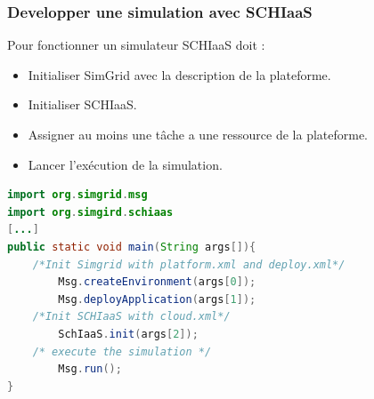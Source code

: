 \documentclass{beamer}
\begin{document}

\begin{frame}[fragile]
	\frametitle{Developper une simulation avec SCHIaaS}
	Pour fonctionner un simulateur SCHIaaS doit :
	\begin{itemize}
		\item Initialiser SimGrid avec la description de la plateforme.
		\item Initialiser SCHIaaS.
		\item Assigner au moins une tâche a une ressource de la plateforme.
		\item Lancer l'exécution de la simulation.
	\end{itemize}
	\begin{lstlisting}[basicstyle=\footnotesize,language=Java,
	backgroundcolor=\color{gray!10},
	commentstyle=\color{red!90}
	]
import org.simgrid.msg
import org.simgird.schiaas
[...]
public static void main(String args[]){
    /*Init Simgrid with platform.xml and deploy.xml*/
        Msg.createEnvironment(args[0]);
        Msg.deployApplication(args[1]);
    /*Init SCHIaaS with cloud.xml*/
        SchIaaS.init(args[2]);
    /* execute the simulation */
        Msg.run();
}
\end{lstlisting}

\end{frame}
\end{document}
